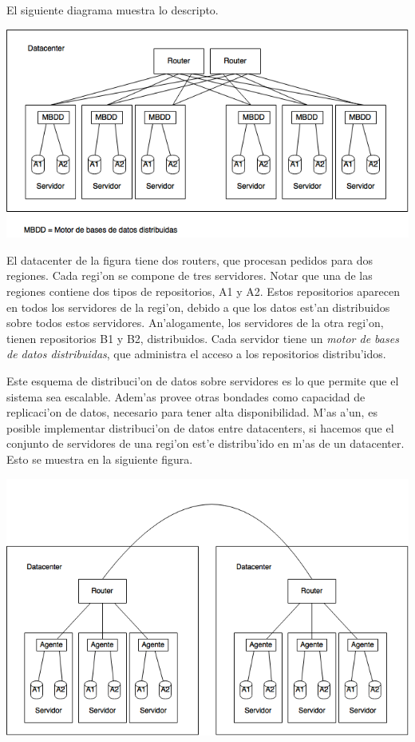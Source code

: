 El siguiente diagrama muestra lo descripto. 

\includegraphics[width=15cm]{diagramas/datacenter.png}

\noindent
El datacenter de la figura tiene dos routers, que procesan pedidos para dos regiones. Cada regi'on se compone de tres servidores. Notar que una de las regiones contiene dos tipos de repositorios, A1 y A2. Estos repositorios aparecen en todos los servidores de la regi'on, debido a que los datos est'an distribuidos sobre todos estos servidores. An'alogamente, los servidores de la otra regi'on, tienen repositorios B1 y B2, distribuidos. Cada servidor tiene un \textit{motor de bases de datos distribuidas}, que administra el acceso a los repositorios distribu'idos.

Este esquema de distribuci'on de datos sobre servidores es lo que permite que el sistema sea escalable. Adem'as provee otras bondades como capacidad de replicaci'on de datos, necesario para tener alta disponibilidad. M'as a'un, es posible implementar distribuci'on de datos entre datacenters, si hacemos que el conjunto de servidores de una regi'on est'e distribu'ido en m'as de un datacenter. Esto se muestra en la siguiente figura.

\includegraphics[width=15cm]{diagramas/datacenterx2.png}

